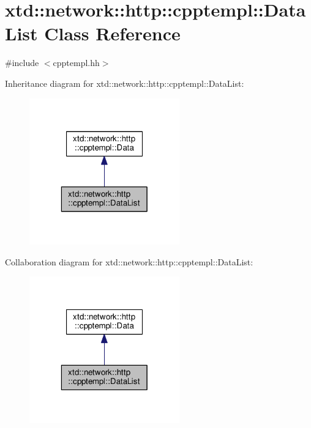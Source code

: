 \hypertarget{classxtd_1_1network_1_1http_1_1cpptempl_1_1DataList}{\section{xtd\-:\-:network\-:\-:http\-:\-:cpptempl\-:\-:Data\-List Class Reference}
\label{classxtd_1_1network_1_1http_1_1cpptempl_1_1DataList}
}


{\ttfamily \#include $<$cpptempl.\-hh$>$}



Inheritance diagram for xtd\-:\-:network\-:\-:http\-:\-:cpptempl\-:\-:Data\-List\-:
\nopagebreak
\begin{figure}[H]
\begin{center}
\leavevmode
\includegraphics[width=184pt]{classxtd_1_1network_1_1http_1_1cpptempl_1_1DataList__inherit__graph}
\end{center}
\end{figure}


Collaboration diagram for xtd\-:\-:network\-:\-:http\-:\-:cpptempl\-:\-:Data\-List\-:
\nopagebreak
\begin{figure}[H]
\begin{center}
\leavevmode
\includegraphics[width=184pt]{classxtd_1_1network_1_1http_1_1cpptempl_1_1DataList__coll__graph}
\end{center}
\end{figure}
